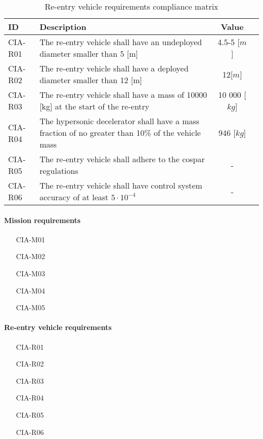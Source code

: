 \begin{table}[h]
\centering
	\caption{Re-entry vehicle requirements compliance matrix} 
	\label{tab:compv}
	\begin{tabular}{|p{}|p{}|c|c|}
	    \hline
	    ID          & Description   & Value &                                                                                           \\ \hline \hline
	CIA-R01 & The re-entry vehicle shall have an undeployed diameter smaller than 5 [m]                   & 4.5-5 [$m$]  & \cmark     				            \\ \hline
	CIA-R02 & The re-entry vehicle shall have a deployed diameter smaller than 12 [m]                     & 12[$m$] &  \cmark 				            \\ \hline	
	CIA-R03 & The re-entry vehicle shall have a mass of 10000 [kg] at the start of the re-entry           & 10 000 [$kg$] &  \cmark          				            \\ \hline
	CIA-R04 & The hypersonic decelerator shall have a mass fraction of no greater than 10\% of the vehicle mass	& 946 [$kg$] & \cmark \\ \hline 
	CIA-R05 &  The re-entry vehicle shall adhere to the \gls{cospar} regulations  & - & \cmark \\ \hline
	CIA-R06 &  The re-entry vehicle shall have control system accuracy of at least $5\cdot 10^{-4}$ & - & \cmark \\ \hline
    \end{tabular}
\end{table}


\paragraph{Mission requirements}

\begin{itemize}
\item[CIA-M01]
\item[CIA-M02]
\item[CIA-M03]
\item[CIA-M04]
\item[CIA-M05]

\end{itemize}

\paragraph{Re-entry vehicle requirements}

\begin{itemize}
\item[CIA-R01]
\item[CIA-R02]
\item[CIA-R03]
\item[CIA-R04]
\item[CIA-R05]
\item[CIA-R06]
\end{itemize}










